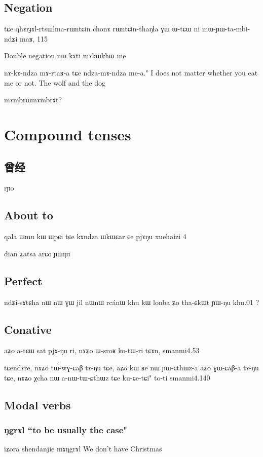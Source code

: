 \documentclass[oldfontcommands,oneside,a4paper,11pt]{memoir}
\newcommand{\ipa}[1]{{\phon #1}} %
\newcommand{\wav}[1]{}%
\begin{document}
\section{Negation}

tɕe qhɤrɟɤl-rtsɯlma-rɯntɕin chonɤ rɯntɕin-thaŋɬa ɣɯ ɯ-tɕɯ ni mɯ-ɲɯ-ta-mbi-ndʑi maʁ,
115

Double negation
nɯ kɤti mɤkɯkhɯ me


nɤ-kɤ-ndza mɤ-rtaʁ-a tɕe ndza-mɤ-ndza me-a."
I does not matter whether you eat me or not.
The wolf and the dog

mɤmbrɯmɤmbrɤt?
\chapter{Compound tenses}

\section{曾经}
rɲo
\section{About to}

qala ɯmu kɯ ɯpɕi tɕe kɤndza ɯkɯɕar ɕe pjɤŋu
xuehaizi 4


dian ʑatsa arɕo ɲɯŋu

\section{Perfect}
ndʑi-sɤtɕha nɯ nɯ ɣɯ jil nɯnɯ rcánɯ khu kɯ lonba ʑo tha-ɕkɯt ɲɯ-ŋu
khu.01 ?

\section{Conative}
aʑo a-tɕɯ sat pjɤ-ŋu ri, nɤʑo ɯ-sroʁ ko-tɯ-ri tɕɤn, 
smanmi4.53


tɕendɤre, nɤʑo tɯ́-wɣ-ɕaβ tɤ-ŋu tɕe, aʑo kɯ ʁe nɯ ɲɯ-ɕthɯz-a
aʑo ɣɯ-ɕaβ-a tɤ-ŋu tɕe, nɤʑo χcha nɯ a-nɯ-tɯ-ɕthɯz tɕe ku-ɕe-tɕi" to-ti
smanmi4.140
\section{Modal verbs}

\subsection{\ipa{ŋgrɤl} ``to be usually the case"}
\wav{8_NgrAl}
iʑora shendanjie mɤŋgrɤl
We don't have Christmas
\end{document}
